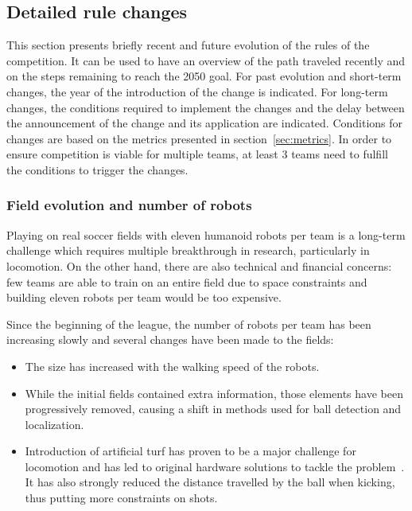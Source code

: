 \documentclass{article}
\begin{document}
\subsection{\label{sec:detailed-rule-changes}Detailed rule changes}
This section presents briefly recent and future evolution of the rules of the
competition.
It can be used to have an overview of the path traveled recently and on the
steps remaining to reach the 2050 goal.
For past evolution and short-term changes, the year of the introduction of the
change is indicated.
For long-term changes, the conditions required to implement the changes and the
delay between the announcement of the change and its application are indicated.
Conditions for changes are based on the metrics presented in section~\ref{sec:metrics}.
In order to ensure competition is viable for multiple teams,
at least 3 teams need to fulfill the conditions to trigger the changes.

\subsubsection{Field evolution and number of robots}
Playing on real soccer fields with eleven humanoid robots per team is a
long-term challenge which requires multiple breakthrough in research,
particularly in locomotion.
On the other hand, there are also technical and financial concerns:
few teams are able to train on an entire field due to space constraints and
building eleven robots per team would be too expensive.

Since the beginning of the league, the number of robots per team has been increasing slowly
and several changes have been made to the fields:
\begin{itemize}
\item The size has increased with the walking speed of the robots.
\item While the initial fields contained extra information, those elements have
  been progressively removed, causing a shift in methods used for ball
  detection and localization.
\item Introduction of artificial turf has proven to be a major challenge for
  locomotion and has led to original hardware solutions to tackle the problem~\cite{Passault2015}.
  It has also strongly reduced the distance travelled by the ball when kicking,
  thus putting more constraints on shots.
\end{itemize}
\end{document}
